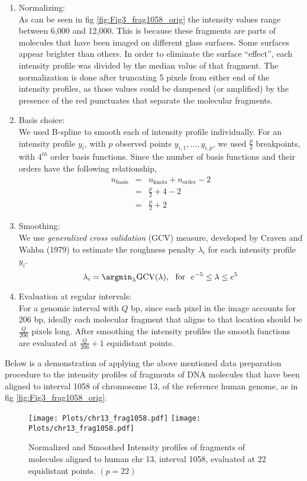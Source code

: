 \begin{enumerate}
\item Normalizing:\\
As can be seen in fig \ref{fig:Fig3_frag1058_orig} the intensity values range between 6,000 and 12,000. This is because these fragments are parts of molecules that have been imaged on different glass surfaces. Some surfaces appear brighter than others. In order to eliminate the surface ``effect'', each intensity profile was divided by the median value of that fragment. The normalization is done after truncating 5 pixels from either end of the intensity profiles, as those values could be dampened (or amplified) by the presence of the red punctuates that separate the molecular fragments.

\item Basis choice:\\
We used B-spline \cite{deBoor_1978_Splines} to smooth each of intensity profile individually. For an intensity profile $y_i$, with $p$ observed points $y_{i,1}, \dots, y_{i,p}$, we used $\frac{p}{2}$ breakpoints, with $4^{th}$ order basis functions. Since the number of basis functions and their orders have the following relationship, 
\begin{eqnarray*}
n_{\text{basis}} &=& n_{\text{knots}} + n_{\text{order}} - 2 \\
                 &=& \frac{p}{2} + 4 - 2\\ 
                 &=& \frac{p}{2} + 2
\end{eqnarray*}
\item Smoothing:\\
We use {\emph{generalized cross validation}} (GCV) measure, developed by Craven and Wahba (1979) \cite{Craven_Wahba_1978_NumMath} to estimate the roughness penalty $\lambda_{i}$ for each intensity profile $y_i$.  
\[ \lambda_i = \argmin_{\lambda} \text{GCV}(\lambda), \ \ \text{for\ \ } e^{-5} \leq \lambda \leq e^5 \]

\item Evaluation at regular intervals: \\
For a genomic interval with $Q$ bp, since each pixel in the image accounts for 206 bp, ideally each molecular fragment that aligns to that location should be $\frac{Q}{206}$ pixels long. After smoothing the intensity profiles the smooth functions are evaluated at $\frac{Q}{206} + 1$ equidistant points. 
\end{enumerate}
Below is a demonstration of applying the above mentioned data preparation procedure to the intensity profiles of fragments of DNA molecules that have been aligned to interval 1058 of chromosome 13, of the reference human genome, as in fig \ref{fig:Fig3_frag1058_orig}.
\begin{figure}[H]
\begin{center}
\texttt{[image: Plots/chr13\_frag1058.pdf]}
\texttt{[image: Plots/chr13\_frag1058.pdf]}
\end{center}
\caption{Normalized and Smoothed Intensity profiles of fragments of molecules aligned to human chr 13, interval 1058, evaluated at 22 equidistant points. $(p = 22)$}
\label{fig:Fig3_frag1058_norm}
\end{figure}

